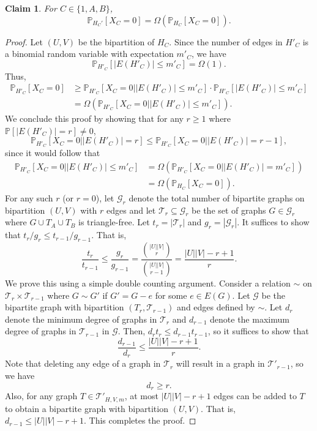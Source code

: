 \documentclass[11pt]{article}
\def\P{\mathbb P}
\theoremstyle{plain}
\newtheorem{claim}{Claim}[thm]
\begin{document}
\begin{claim}\label{clm: m to p}
    For $C \in \{1,A,B\}$,
    \[
    \P_{H_C'}[X_C = 0] =\Omega(\P_{H_C}[X_C = 0]).
    \]
\end{claim}
\begin{proof}
    Let $(U,V)$ be the bipartition of $H_C$. Since the number of edges in $H'_C$ is a binomial random variable with expectation $m'_C$, we have 
    \[
    \P_{H'_C}[|E(H'_C)|\leq m'_C] = \Omega(1).
    \] 
    Thus, 
    \begin{align*}
        \P_{H'_C}[X_C = 0] &\geq \P_{H'_C}[X_C = 0 \mathrel ||E(H'_C)| \leq m'_C] \cdot\P_{H'_C}[|E(H'_C)| \leq m'_C]\\
        &= \Omega(\P_{H'_C}[X_C = 0 \mathrel ||E(H'_C)| \leq m'_C]).
    \end{align*}
We conclude this proof by showing that for any $r \geq 1$ where $\P[|E(H'_C)| = r] \neq 0$, 
    \[
        \P_{H'_C}[X_C = 0 \mathrel | |E(H'_C)| = r] \leq \P_{H'_C}[X_C = 0 \mathrel||E(H'_C)| = r-1],
    \]
    since it would follow that 
    \begin{align*}
        \P_{H'_C}[X_C = 0\mathrel | |E(H'_C)| \leq m'_C] &= \Omega(\P_{H'_C}[X_C = 0\mathrel | |E(H'_C)| = m'_C])\\
        &= \Omega(\P_{H_C}[X_C = 0]).
    \end{align*}
    For any such $r$ (or $r = 0$), let $\mathcal G_r$ denote the total number of bipartite graphs on bipartition $(U,V)$ with $r$ edges and let $\mathcal T_r \subseteq \mathcal G_r$ be the set of graphs $G \in \mathcal G_r$ where $G \cup T_A \cup T_B$ is triangle-free. Let $t_r = |\mathcal T_r|$ and $g_r = |\mathcal G_r|$. It suffices to show that $t_r/g_r \leq t_{r-1}/g_{r-1}$. That is,
    \[
    \frac{t_{r}}{t_{r-1}} \leq \frac{g_{r}}{g_{r-1}} = \frac{\binom{|U||V|}{r}}{\binom{|U||V|}{r-1}} = \frac{|U||V| - r + 1}{r}.
    \]
    We prove this using a simple double counting argument. Consider a relation $\sim $ on $\mathcal T_r \times \mathcal T_{r-1}$ where $G \sim G'$ if $G' = G -e$ for some $e \in E(G)$. Let $\mathscr G$ be the bipartite graph with bipartition $(T_{r} , \mathcal T_{r-1})$ and edges defined by $\sim$. Let $d_r$ denote the minimum degree of graphs in $\mathcal T_{r}$ and $d_{r-1}$ denote the maximum degree of graphs in $\mathcal T_{r-1}$ in $\mathscr G$. Then, $d_rt_r \leq d_{r-1}t_{r-1}$, so it suffices to show that 
    \[
    \frac{d_{r-1}}{d_{r}} \leq \frac{|U||V| - r+1}{r}.
    \]
    Note that deleting any edge of a graph in $\mathcal T_{r}$ will result in a graph in $\mathcal T'_{r-1}$, so we have 
    \[
    d_r \geq r.
    \]
    Also, for any graph $T \in \mathcal T'_{H, V, m}$, at most $|U||V| - r + 1$ edges can be added to $T$ to obtain a bipartite graph with bipartition $(U, V)$. That is,  $d_{r-1} \leq |U||V| - r+1$. This completes the proof.
\end{proof}
\end{document}
